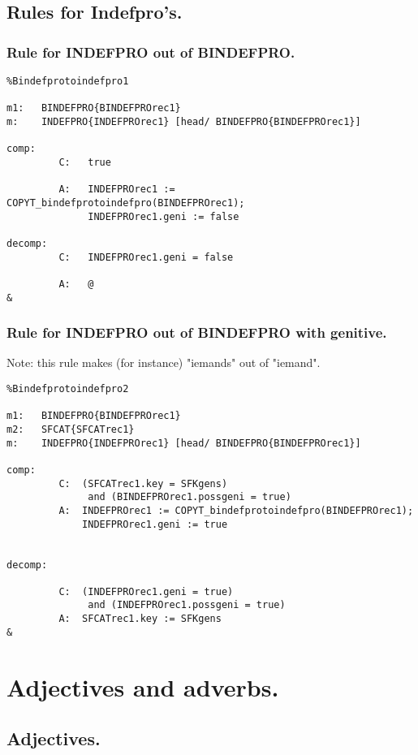 \subsection{Rules for Indefpro's.}
\subsubsection{Rule for INDEFPRO out of BINDEFPRO.}
\begin{verbatim}
%Bindefprotoindefpro1

m1:   BINDEFPRO{BINDEFPROrec1}
m:    INDEFPRO{INDEFPROrec1} [head/ BINDEFPRO{BINDEFPROrec1}]

comp:    
         C:   true

         A:   INDEFPROrec1 := COPYT_bindefprotoindefpro(BINDEFPROrec1);
              INDEFPROrec1.geni := false 

decomp:  
         C:   INDEFPROrec1.geni = false 

         A:   @
&
\end{verbatim}
\newpage
\subsubsection{Rule for INDEFPRO out of BINDEFPRO with genitive.}

Note: this rule makes (for instance) "iemands" out of "iemand".
\begin{verbatim}
%Bindefprotoindefpro2

m1:   BINDEFPRO{BINDEFPROrec1}
m2:   SFCAT{SFCATrec1}
m:    INDEFPRO{INDEFPROrec1} [head/ BINDEFPRO{BINDEFPROrec1}]

comp:    
         C:  (SFCATrec1.key = SFKgens) 
              and (BINDEFPROrec1.possgeni = true)
         A:  INDEFPROrec1 := COPYT_bindefprotoindefpro(BINDEFPROrec1);
             INDEFPROrec1.geni := true


decomp:  

         C:  (INDEFPROrec1.geni = true) 
              and (INDEFPROrec1.possgeni = true)
         A:  SFCATrec1.key := SFKgens
&
\end{verbatim}



\newpage
\section{Adjectives and adverbs.}
\subsection{Adjectives.}
